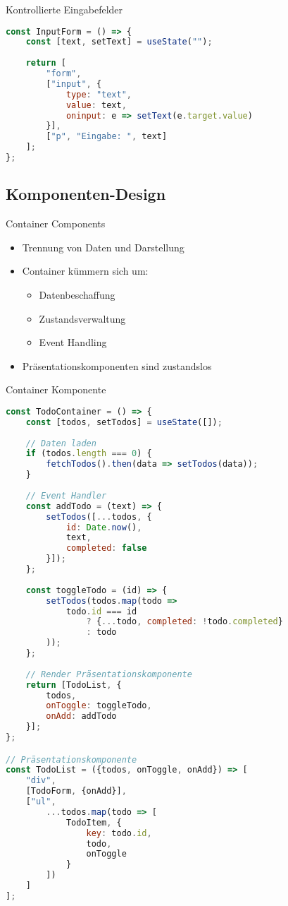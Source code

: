 \begin{KR}{Kontrollierte Eingabefelder}
\begin{lstlisting}[language=JavaScript, style=basesmol]
const InputForm = () => {
    const [text, setText] = useState("");
    
    return [
        "form",
        ["input", {
            type: "text",
            value: text,
            oninput: e => setText(e.target.value)
        }],
        ["p", "Eingabe: ", text]
    ];
};
\end{lstlisting}
\end{KR}

\subsection{Komponenten-Design}

\begin{concept}{Container Components}
    \begin{itemize}
        \item Trennung von Daten und Darstellung
        \item Container kümmern sich um:
            \begin{itemize}
                \item Datenbeschaffung
                \item Zustandsverwaltung
                \item Event Handling
            \end{itemize}
        \item Präsentationskomponenten sind zustandslos
    \end{itemize}
\end{concept}

\begin{KR}{Container Komponente}
\begin{lstlisting}[language=JavaScript, style=basesmol]
const TodoContainer = () => {
    const [todos, setTodos] = useState([]);
    
    // Daten laden
    if (todos.length === 0) {
        fetchTodos().then(data => setTodos(data));
    }
    
    // Event Handler
    const addTodo = (text) => {
        setTodos([...todos, {
            id: Date.now(),
            text,
            completed: false
        }]);
    };
    
    const toggleTodo = (id) => {
        setTodos(todos.map(todo =>
            todo.id === id
                ? {...todo, completed: !todo.completed}
                : todo
        ));
    };
    
    // Render Präsentationskomponente
    return [TodoList, {
        todos,
        onToggle: toggleTodo,
        onAdd: addTodo
    }];
};

// Präsentationskomponente
const TodoList = ({todos, onToggle, onAdd}) => [
    "div",
    [TodoForm, {onAdd}],
    ["ul",
        ...todos.map(todo => [
            TodoItem, {
                key: todo.id,
                todo,
                onToggle
            }
        ])
    ]
];
\end{lstlisting}
\end{KR}

